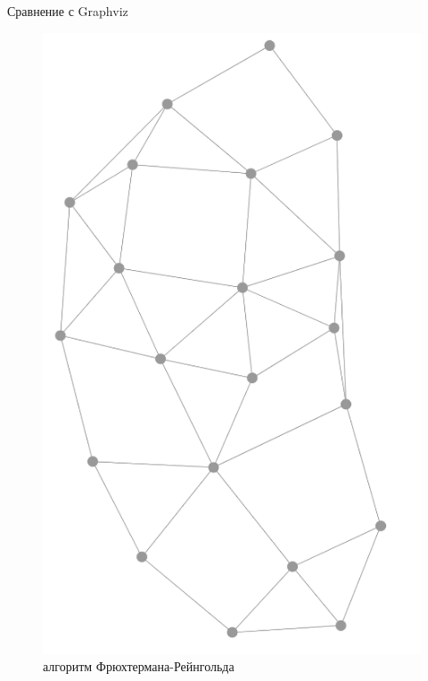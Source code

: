 \documentclass{beamer}
\begin{document}
\begin{frame}{Сравнение с Graphviz}
	\begin{figure}[H]
		\centering
		\begin{minipage}[t]{.32\textwidth}
			\centering
			\includegraphics[width=0.75\linewidth]{./imgs/fg_small_dense.png}
			\caption*{алгоритм Фрюхтермана-Рейнгольда}
		\end{minipage}
		\noindent
		\begin{minipage}[t]{.32\textwidth}
			\centering

\end{minipage}
\end{figure}
\end{frame}
\end{document}
